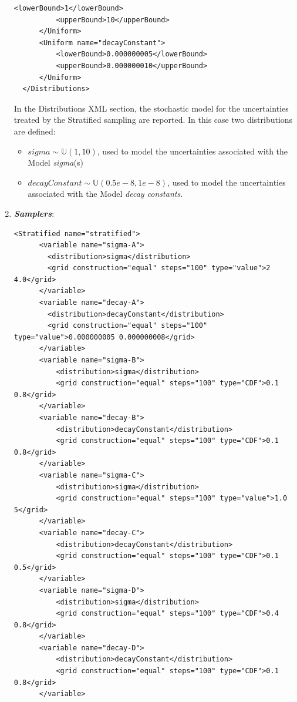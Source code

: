 \begin{enumerate}
\begin{lstlisting}[style=XML,morekeywords={arg,extension,pauseAtEnd,overwrite}]
          <lowerBound>1</lowerBound>
          <upperBound>10</upperBound>
      </Uniform>
      <Uniform name="decayConstant">
          <lowerBound>0.000000005</lowerBound>
          <upperBound>0.000000010</upperBound>
      </Uniform>
  </Distributions>   
\end{lstlisting}
  In the Distributions XML section, the stochastic model for the 
  uncertainties  treated by the Stratified sampling are reported. In 
  this case two distributions are defined: 
  \begin{itemize}
    \item $sigma \sim \mathbb{U}(1,10)$, used to model the uncertainties 
    associated with  the Model \textit{sigma}(s)
    \item  $decayConstant \sim \mathbb{U}(0.5e-8,1e-8)$,  used to 
    model the uncertainties 
    associated with  the Model \textit{decay constants}.
  \end{itemize}
   \item \textbf{\textit{Samplers}}:
\begin{lstlisting}[style=XML,morekeywords={arg,extension,pauseAtEnd,overwrite}]
    <Stratified name="stratified">
      <variable name="sigma-A">
        <distribution>sigma</distribution>
        <grid construction="equal" steps="100" type="value">2 4.0</grid>
      </variable>
      <variable name="decay-A">
        <distribution>decayConstant</distribution>
        <grid construction="equal" steps="100" type="value">0.000000005 0.000000008</grid>
      </variable>
      <variable name="sigma-B">
          <distribution>sigma</distribution>
          <grid construction="equal" steps="100" type="CDF">0.1 0.8</grid>
      </variable>
      <variable name="decay-B">
          <distribution>decayConstant</distribution>
          <grid construction="equal" steps="100" type="CDF">0.1 0.8</grid>
      </variable>
      <variable name="sigma-C">
          <distribution>sigma</distribution>
          <grid construction="equal" steps="100" type="value">1.0 5</grid>
      </variable>
      <variable name="decay-C">
          <distribution>decayConstant</distribution>
          <grid construction="equal" steps="100" type="CDF">0.1 0.5</grid>
      </variable>
      <variable name="sigma-D">
          <distribution>sigma</distribution>
          <grid construction="equal" steps="100" type="CDF">0.4 0.8</grid>
      </variable>
      <variable name="decay-D">
          <distribution>decayConstant</distribution>
          <grid construction="equal" steps="100" type="CDF">0.1 0.8</grid>
      </variable>

\end{lstlisting}
\end{enumerate}
